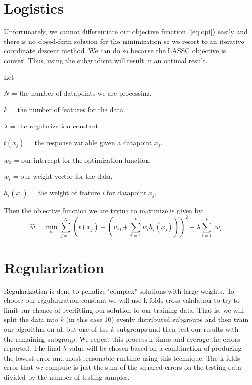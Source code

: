 \documentclass{article}
\begin{document}
\section{Logistics}
\label{Logistics}
Unfortunately, we cannot differentiate our objective function (\ref{eq:opt}) easily and there is no closed-form solution for the minimization so we resort to an iterative coordinate descent method. We can do so because the LASSO objective is convex. Thus, using the subgradient will result in an optimal result.
\newpage
\begin{description}
\item Let
\item $N$ = the number of datapoints we are processing.
\item $k$ = the number of features for the data.
\item $\lambda$ = the regularization constant.
\item $t({x_j})$ = the response variable given a datapoint ${x_j}$.
\item ${w_0}$ = our intercept for the optimization function.
\item ${w_i}$ = our weight vector for the data.
\item ${h_i}({x_j})$ = the weight of feature $i$ for datapoint ${x_j}$.
\end{description}
Then the objective function we are trying to maximize is given by:
\begin{equation}\label{eq:opt}
{\hat{w}} = \min\limits_{w} \sum_{j=1}^{N} \left(t\left({x_j}\right) - ({w_0} + \sum_{i=1}^{k} {w_i}{h_i}({x_j}))\right)^2 + \lambda\sum_{i=1}^{k} |{w_i}|
\end{equation}
\section{Regularization}
\label{Regularization}
Regularization is done to penalize "complex" solutions with large weights. To choose our regularization constant we will use k-folds cross-validation to try to limit our chance of overfitting our solution to our training data. That is, we will split the data into $k$ (in this case 10) evenly distributed subgroups and then train our algorithm on all but one of the $k$ subgroups and then test our results with the remaining subgroup. We repeat this process k times and average the errors reported. The final $\lambda$ value will be chosen based on a combination of producing the lowest error and most reasonable runtime using this technique. The k-folds error that we compute is just the sum of the squared errors on the testing data divided by the number of testing samples.
\end{document}
